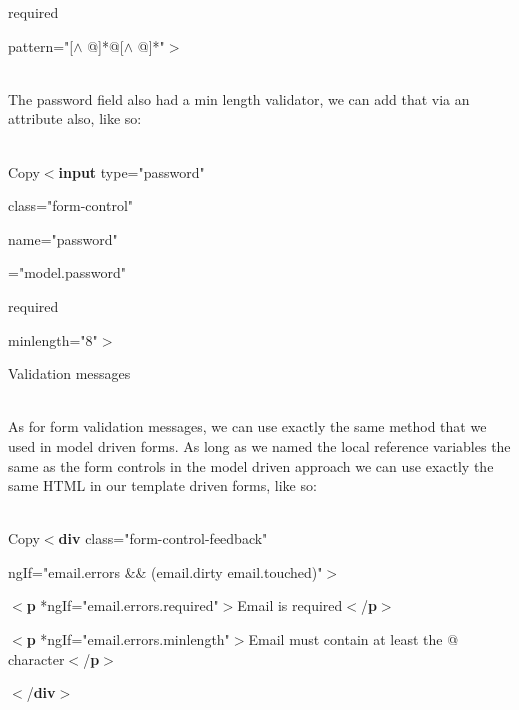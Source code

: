 \documentclass{article}
\begin{document}
\noindent required

\noindent pattern="[$\mathrm{\wedge}$ @]*@[$\mathrm{\wedge}$ @]*"$\mathrm{>}$ 

\noindent 

\noindent \\  The password field also had a min length validator, we can add that via an attribute also, like so: 

 

\noindent \\  Copy$\mathrm{<}$\textbf{input} type="password" 

\noindent class="form-control" 

\noindent name="password" 

\noindent [(ngModel)]="model.password" 

\noindent required

\noindent minlength="8"$\mathrm{>}$ 

\noindent Validation messages

\noindent \\  As for form validation messages, we can use exactly the same method that we used in model driven forms. As long as we named the local reference variables the same as the form controls in the model driven approach we can use exactly the same HTML in our template driven forms, like so: 

  

\noindent \\  Copy$\mathrm{<}$\textbf{div} class="form-control-feedback"

\noindent *ngIf="email.errors \&\& (email.dirty {\textbar}{\textbar}  email.touched)"$\mathrm{>}$

\noindent $\mathrm{<}$\textbf{p} *ngIf="email.errors.required"$\mathrm{>}$Email is required$\mathrm{<}$/\textbf{p}$\mathrm{>}$

\noindent $\mathrm{<}$\textbf{p} *ngIf="email.errors.minlength"$\mathrm{>}$Email must contain at least the @ character$\mathrm{<}$/\textbf{p}$\mathrm{>}$

\noindent $\mathrm{<}$/\textbf{div}$\mathrm{>}$ 

  

  

\noindent 
\end{document}
